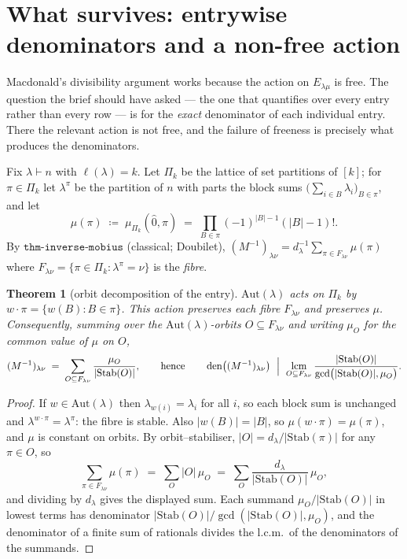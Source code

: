 \documentclass[11pt]{article}
\newtheorem{theorem}{Theorem}
\theoremstyle{definition}
\newcommand{\lam}{\lambda}
\newcommand{\Stab}{\mathrm{Stab}}
\newcommand{\Aut}{\mathrm{Aut}}
\newcommand{\htz}{\hat 0}
\DeclareMathOperator{\den}{den}
\DeclareMathOperator{\lcm}{lcm}
\begin{document}
\section{What survives: entrywise denominators and a non-free action}

Macdonald's divisibility argument works because the action on $E_{\lam\mu}$ is free. The question the
brief should have asked --- the one that quantifies over every entry rather than every row --- is for
the \emph{exact} denominator of each individual entry. There the relevant action is not free, and the
failure of freeness is precisely what produces the denominators.

Fix $\lam\vdash n$ with $\ell(\lam)=k$. Let $\Pi_k$ be the lattice of set partitions of $[k]$; for
$\pi\in\Pi_k$ let $\lam^\pi$ be the partition of $n$ with parts the block sums
$\bigl(\sum_{i\in B}\lam_i\bigr)_{B\in\pi}$, and let
\[
  \mu(\pi)\;\coloneqq\;\mu_{\Pi_k}(\htz,\pi)\;=\;\prod_{B\in\pi}(-1)^{|B|-1}(|B|-1)!.
\]
By $\texttt{thm-inverse-mobius}$ (classical; Doubilet),
$(M^{-1})_{\lam\nu}=d_\lam^{-1}\sum_{\pi\in F_{\lam\nu}}\mu(\pi)$ where
$F_{\lam\nu}=\{\pi\in\Pi_k:\lam^\pi=\nu\}$ is the \emph{fibre}.

\begin{theorem}[orbit decomposition of the entry]\label{thm:orbit}
$\Aut(\lam)$ acts on $\Pi_k$ by $w\cdot\pi=\{w(B):B\in\pi\}$. This action preserves each fibre
$F_{\lam\nu}$ and preserves $\mu$. Consequently, summing over the $\Aut(\lam)$-orbits
$O\subseteq F_{\lam\nu}$ and writing $\mu_O$ for the common value of $\mu$ on $O$,
\[
  (M^{-1})_{\lam\nu}\;=\;\sum_{O\subseteq F_{\lam\nu}}\frac{\mu_O}{|\Stab(O)|},
  \qquad\text{hence}\qquad
  \den\bigl((M^{-1})_{\lam\nu}\bigr)\ \Bigm|\
  \lcm_{O\subseteq F_{\lam\nu}}\frac{|\Stab(O)|}{\gcd\bigl(|\Stab(O)|,\mu_O\bigr)} .
\]
\end{theorem}

\begin{proof}
If $w\in\Aut(\lam)$ then $\lam_{w(i)}=\lam_i$ for all $i$, so each block sum is unchanged and
$\lam^{w\cdot\pi}=\lam^\pi$: the fibre is stable. Also $|w(B)|=|B|$, so $\mu(w\cdot\pi)=\mu(\pi)$,
and $\mu$ is constant on orbits. By orbit--stabiliser, $|O|=d_\lam/|\Stab(\pi)|$ for any
$\pi\in O$, so
\[
  \sum_{\pi\in F_{\lam\nu}}\mu(\pi)\;=\;\sum_{O}|O|\,\mu_O
  \;=\;\sum_{O}\frac{d_\lam}{|\Stab(O)|}\,\mu_O ,
\]
and dividing by $d_\lam$ gives the displayed sum. Each summand $\mu_O/|\Stab(O)|$ in lowest terms has
denominator $|\Stab(O)|/\gcd(|\Stab(O)|,\mu_O)$, and the denominator of a finite sum of rationals
divides the l.c.m.\ of the denominators of the summands.
\end{proof}
\end{document}
